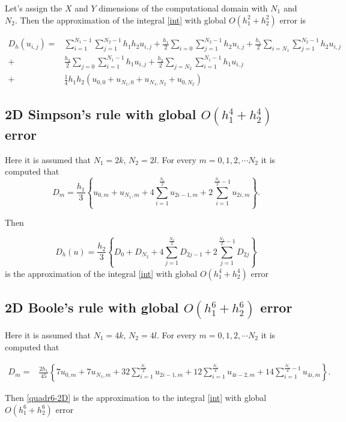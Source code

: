 \documentclass{article}
\begin{document}
Let's assign the $X$ and $Y$ dimensions of the computational domain with $N_1$ and $N_2$. Then the approximation of the integral \eqref{int} 
with global $O(h_1^2+h_2^2)$ error is

\begin{align}\label{quadr2}
D_h(u_{i,j}) =& \sum_{i=1}^{N_1-1} \sum_{j=1}^{N_2-1} h_1 h_2 u_{i,j}
+\frac{h_1}{2}\sum_{i=0} \sum_{j=1}^{N_2-1} h_2 u_{i,j}
+\frac{h_1}{2}\sum_{i=N_1} \sum_{j=1}^{N_2-1} h_2 u_{i,j} \nonumber\\
+&\frac{h_2}{2}\sum_{j=0} \sum_{i=1}^{N_1-1} h_1 u_{i,j}
+\frac{h_2}{2}\sum_{j=N_2} \sum_{i=1}^{N_1-1} h_1 u_{i,j}
\nonumber\\
+&\frac{1}{4}h_1 h_2 \left(u_{0,0}+u_{N_1,0}+u_{N_1,N_2}+u_{0,N_2}
\right)
\end{align}

\subsection{ 2D Simpson's rule with global $O(h_1^4+h_2^4)$ error}

Here it is assumed that $N_1=2k$, $N_2=2 l$. For every $m=0,1,2,\cdots N_2$ it is computed that 
$$D_m= \frac{h_1 }{3} 
\left\{ u_{0,m}+u_{N_1,m}+ 4 \sum_{i=1}^{\frac{N_1}{2}}   u_{2i-1,m}
 +2 \sum_{i=1}^{\frac{N_1}{2}-1} u_{2i,m} \right\}.$$


Then 

\begin{equation}\label{quadr4}
D_h(u)=\frac{h_2 }{3} 
\left\{ D_{0}+D_{N_2}+ 4 \sum_{j=1}^{\frac{N_2}{2}}   D_{2j-1}
 +2 \sum_{j=1}^{{\frac{N_2}{2}}-1} D_{2j} \right\}
\end{equation}
is the approximation of the integral \eqref{int} with global $O(h_1^4+h_2^4)$ error


\subsection{ 2D Boole's rule with global $O(h_1^6+h_2^6)$ error }
Here it is assumed that $N_1=4k$, $N_2=4 l$. For every $m=0,1,2,\cdots N_2$ it is computed that

\begin{align*}
D_m =& \frac{2h_1}{45} 
\left\{
7u_{0,m}+7u_{N_1,m}+32 \sum_{i=1}^{\frac{N_1}{2}}u_{2i-1,m}
+12\sum_{i=1}^{\frac{N_1}{4}}u_{4i-2,m}
+14 \sum_{i=1}^{\frac{N_1}{4}-1}u_{4i,m}
\right\}.
\end{align*}


Then \eqref{quadr6-2D} is the approximation to the integral \eqref{int} with global $O(h_1^6+h_2^6)$ error
\end{document}
